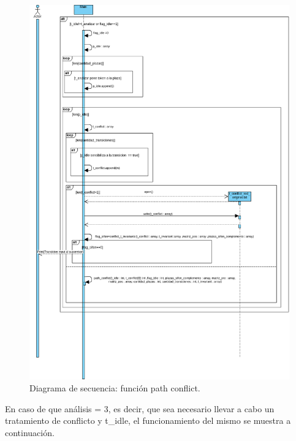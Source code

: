 \begin{figure}[H]
	\centering
	\includegraphics[width=\textwidth]{Figures/diagramasecuencia/Diagrama4.png}
	\caption{Diagrama de secuencia: función path conflict.}
	\label{fig:diagrama-sec4}
\end{figure}

En caso de que análisis = 3, es decir, que sea necesario llevar a cabo un tratamiento de conflicto y t\_idle, el funcionamiento del mismo se muestra a continuación.


